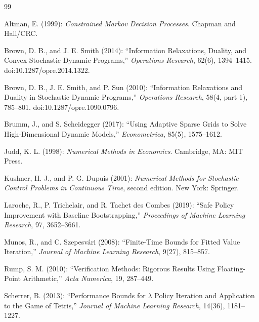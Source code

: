 \begin{thebibliography}{99}

Altman, E. (1999): \emph{Constrained Markov Decision Processes}. Chapman and Hall/CRC.

Brown, D. B., and J. E. Smith (2014): ``Information Relaxations, Duality, and Convex Stochastic Dynamic Programs,'' \emph{Operations Research}, 62(6), 1394--1415. doi:10.1287/opre.2014.1322.

Brown, D. B., J. E. Smith, and P. Sun (2010): ``Information Relaxations and Duality in Stochastic Dynamic Programs,'' \emph{Operations Research}, 58(4, part 1), 785--801. doi:10.1287/opre.1090.0796.

Brumm, J., and S. Scheidegger (2017): ``Using Adaptive Sparse Grids to Solve High-Dimensional Dynamic Models,'' \emph{Econometrica}, 85(5), 1575--1612.

Judd, K. L. (1998): \emph{Numerical Methods in Economics}. Cambridge, MA: MIT Press.

Kushner, H. J., and P. G. Dupuis (2001): \emph{Numerical Methods for Stochastic Control Problems in Continuous Time}, second edition. New York: Springer.

Laroche, R., P. Trichelair, and R. Tachet des Combes (2019): ``Safe Policy Improvement with Baseline Bootstrapping,'' \emph{Proceedings of Machine Learning Research}, 97, 3652--3661.

Munos, R., and C. Szepesv\'ari (2008): ``Finite-Time Bounds for Fitted Value Iteration,'' \emph{Journal of Machine Learning Research}, 9(27), 815--857.

Rump, S. M. (2010): ``Verification Methods: Rigorous Results Using Floating-Point Arithmetic,'' \emph{Acta Numerica}, 19, 287--449.

Scherrer, B. (2013): ``Performance Bounds for $\lambda$ Policy Iteration and Application to the Game of Tetris,'' \emph{Journal of Machine Learning Research}, 14(36), 1181--1227.

\end{thebibliography}
